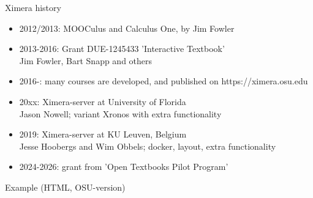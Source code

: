 \begin{frame}{Ximera history}
  \begin{itemize}[<+->]
    \item 2012/2013: MOOCulus and Calculus One, by Jim Fowler
    \item 2013-2016: Grant DUE-1245433  'Interactive Textbook' \\  Jim Fowler, Bart Snapp and others
    \item 2016-: many courses are developed, and published on https://ximera.osu.edu
    \item 20xx: Ximera-server at University of Florida \\ Jason Nowell; variant Xronos with extra functionality
    \item 2019: Ximera-server at KU Leuven, Belgium \\ Jesse Hoobergs and Wim Obbels; docker, layout, extra functionality
    \item 2024-2026: grant from 'Open Textbooks Pilot Program'
  \end{itemize}

\end{frame}

\begin{frame}[t]{Example (HTML, OSU-version)}
  \begin{center}
  \end{center}
\end{frame}

